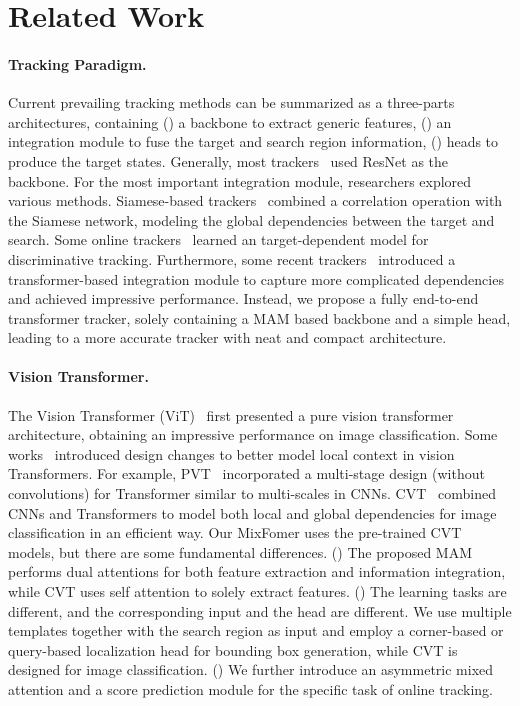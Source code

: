 \section{Related Work}
\paragraph{Tracking Paradigm.}
Current prevailing tracking methods can be summarized as a three-parts architectures, containing () a backbone to extract generic features, () an integration module to fuse the target and search region information, () heads to produce the target states. Generally, most trackers~\cite{siamrpnPlus, atom,dimp,transt,siamrcnn} used ResNet as the backbone. For the most important integration module, researchers explored various methods. Siamese-based trackers~\cite{siamfc,siamrpn,siamcar,dasiamrpn} combined a correlation operation with the Siamese network, modeling the global dependencies between the target and search. Some online trackers~\cite{eco,kcf,bacf,strcf,dcf_,atom,dimp,fcot} learned an target-dependent model for discriminative tracking. Furthermore, some recent trackers~\cite{transt,stark,treg,stmtrack,tmt} introduced a transformer-based integration module to capture more complicated dependencies and achieved impressive performance. Instead, we propose a fully end-to-end transformer tracker, solely containing a MAM based backbone and a simple head, leading to a more accurate tracker with neat and compact architecture.

\paragraph{Vision Transformer.} 
The Vision Transformer (ViT)~\cite{vit} first presented a pure vision transformer architecture, obtaining an impressive performance on image classification.
Some works~\cite{t2t,localvit,pvt} introduced design changes to better model local context in vision Transformers. For example, PVT~\cite{pvt} incorporated a multi-stage design (without convolutions) for Transformer similar to multi-scales in CNNs.
CVT~\cite{cvt} combined CNNs and Transformers to model both local and global dependencies for image classification in an efficient way. Our MixFomer uses the pre-trained CVT models, but there are some fundamental differences. () The proposed MAM performs dual attentions for both feature extraction and information integration, while CVT uses self attention to solely extract features. () The learning tasks are different, and the corresponding input and the head are different. We use multiple templates together with the search region as input and employ a corner-based or query-based localization head for bounding box generation, while CVT is designed for image classification. () We further introduce an asymmetric mixed attention and a score prediction module for the specific task of online tracking. 

